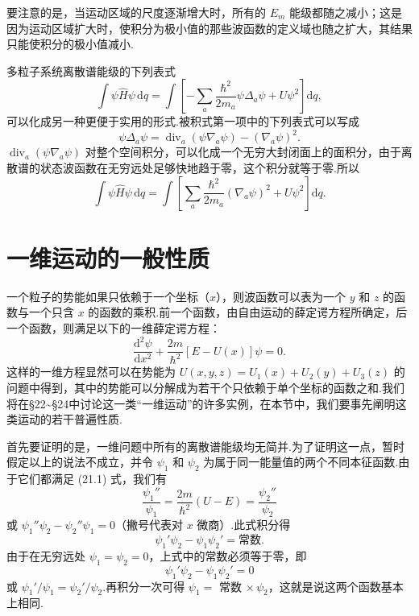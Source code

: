 要注意的是，当运动区域的尺度逐渐增大时，所有的 $E_m$ 能级都随之减小；这是因为运动区域扩大时，使积分为极小值的那些波函数的定义域也随之扩大，其结果只能使积分的极小值减小.

多粒子系统离散谱能级的下列表式
\begin{equation*}
  \int\psi\hat{H}\psi\,\mathrm{d}q
  =\int\left[-\sum_a\frac{\hbar^2}{2m_a}\psi\Delta_a\psi
  +U\psi^2\right]\mathrm{d}q,
\end{equation*}
可以化成另一种更便于实用的形式.被积式第一项中的下列表式可以写成
\begin{equation*}
  \psi\Delta_a\psi
  =\operatorname{div}_a\left(\psi\nabla_a\psi\right)
  -\left(\nabla_a\psi\right)^2.
\end{equation*}
$\operatorname{div}_a\left(\psi\nabla_a\psi\right)$ 对整个空间积分，可以化成一个无穷大封闭面上的面积分，由于离散谱的状态波函数在无穷远处足够快地趋于零，这个积分就等于零.所以
\begin{equation}
  \int\psi\hat{H}\psi\,\mathrm{d}q
  =\int\left[\sum_a\frac{\hbar^2}{2m_a}\left(\nabla_a\psi\right)^2
  +U\psi^2\right]\mathrm{d}q.
\end{equation}

\section{一维运动的一般性质}

一个粒子的势能如果只依赖于一个坐标（$x$），则波函数可以表为一个 $y$ 和 $z$ 的函数与一个只含 $x$ 的函数的乘积.前一个函数，由自由运动的薛定谔方程所确定，后一个函数，则满足以下的一维薛定谔方程：
\begin{equation}
  \frac{\mathrm{d}^2\psi}{\mathrm{d}x^2}
  +\frac{2m}{\hbar^2}\left[E-U(x)\right]\psi=0.
\end{equation}
这样的一维方程显然可以在势能为 $U(x,y,z)=U_1(x)+U_2(y)+U_3(z)$ 的问题中得到，其中的势能可以分解成为若干个只依赖于单个坐标的函数之和.我们将在§22\textasciitilde§24中讨论这一类“一维运动”的许多实例，在本节中，我们要事先阐明这类运动的若干普遍性质.

首先要证明的是，一维问题中所有的离散谱能级均无简并.为了证明这一点，暂时假定以上的说法不成立，并令 $\psi_1$ 和 $\psi_2$ 为属于同一能量值的两个不同本征函数.由于它们都满足 (21.1) 式，我们有
\begin{equation*}
  \frac{\psi_1''}{\psi_1}
  =\frac{2m}{\hbar^2}\left(U-E\right)
  =\frac{\psi_2''}{\psi_2}
\end{equation*}
或 $\psi_1''\psi_2-\psi_2''\psi_1=0$（撇号代表对 $x$ 微商）.此式积分得
\begin{equation}
  \psi_1'\psi_2-\psi_1\psi_2'=\text{常数}.
\end{equation}
由于在无穷远处 $\psi_1=\psi_2=0$，上式中的常数必须等于零，即
\begin{equation*}
  \psi_1'\psi_2-\psi_1\psi_2'=0
\end{equation*}
或 $\psi_1'/\psi_1=\psi_2'/\psi_2$.再积分一次可得 $\psi_1=$ 常数 $\times\,\psi_2$，这就是说这两个函数基本上相同.

